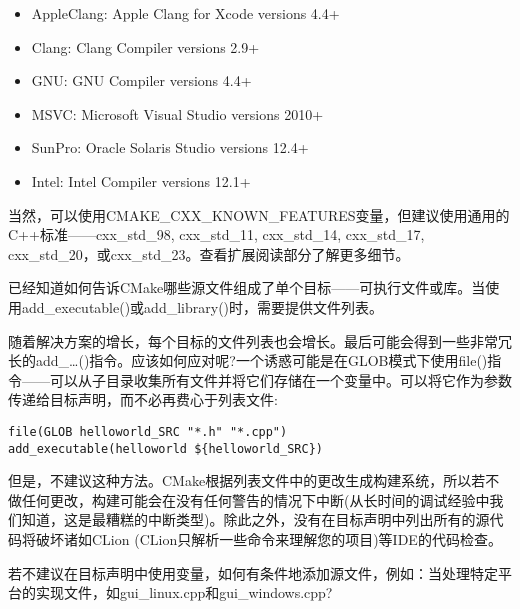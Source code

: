 \begin{itemize}
\item 
AppleClang: Apple Clang for Xcode versions 4.4+

\item 
Clang: Clang Compiler versions 2.9+

\item 
GNU: GNU Compiler versions 4.4+

\item 
MSVC: Microsoft Visual Studio versions 2010+

\item 
SunPro: Oracle Solaris Studio versions 12.4+

\item 
Intel: Intel Compiler versions 12.1+
\end{itemize}

\begin{tcolorbox}[colback=blue!5!white,colframe=blue!75!black,title=重要的Note]
当然，可以使用CMAKE\_CXX\_KNOWN\_FEATURES变量，但建议使用通用的C++标准——cxx\_std\_98, cxx\_std\_11, cxx\_std\_14, cxx\_std\_17, cxx\_std\_20，或cxx\_std\_23。查看扩展阅读部分了解更多细节。
\end{tcolorbox}


已经知道如何告诉CMake哪些源文件组成了单个目标——可执行文件或库。当使用add\_executable()或add\_library()时，需要提供文件列表。

随着解决方案的增长，每个目标的文件列表也会增长。最后可能会得到一些非常冗长的add\_…()指令。应该如何应对呢?一个诱惑可能是在GLOB模式下使用file()指令——可以从子目录收集所有文件并将它们存储在一个变量中。可以将它作为参数传递给目标声明，而不必再费心于列表文件:

\begin{lstlisting}[style=styleCMake]
file(GLOB helloworld_SRC "*.h" "*.cpp")
add_executable(helloworld ${helloworld_SRC})
\end{lstlisting}

但是，不建议这种方法。CMake根据列表文件中的更改生成构建系统，所以若不做任何更改，构建可能会在没有任何警告的情况下中断(从长时间的调试经验中我们知道，这是最糟糕的中断类型)。除此之外，没有在目标声明中列出所有的源代码将破坏诸如CLion (CLion只解析一些命令来理解您的项目)等IDE的代码检查。

若不建议在目标声明中使用变量，如何有条件地添加源文件，例如：当处理特定平台的实现文件，如gui\_linux.cpp和gui\_windows.cpp?

